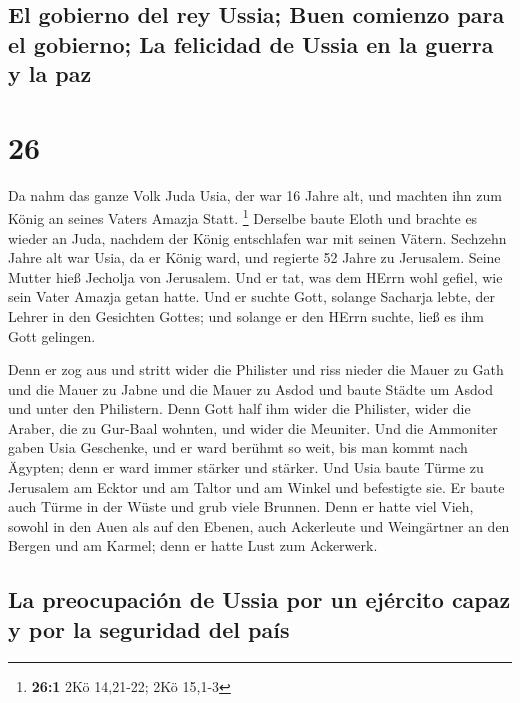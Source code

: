 \hypertarget{el-gobierno-del-rey-ussia-buen-comienzo-para-el-gobierno-la-felicidad-de-ussia-en-la-guerra-y-la-paz}{%
\subsection{El gobierno del rey Ussia; Buen comienzo para el gobierno;
La felicidad de Ussia en la guerra y la
paz}\label{el-gobierno-del-rey-ussia-buen-comienzo-para-el-gobierno-la-felicidad-de-ussia-en-la-guerra-y-la-paz}}

\hypertarget{section-25}{%
\section{26}\label{section-25}}

 Da nahm das ganze Volk Juda Usia, der war 16 Jahre alt,
und machten ihn zum König an seines Vaters Amazja Statt. \footnote{\textbf{26:1}
  2Kö 14,21-22; 2Kö 15,1-3}  Derselbe baute Eloth und
brachte es wieder an Juda, nachdem der König entschlafen war mit seinen
Vätern.  Sechzehn Jahre alt war Usia, da er König ward,
und regierte 52 Jahre zu Jerusalem. Seine Mutter hieß Jecholja von
Jerusalem.  Und er tat, was dem HErrn wohl gefiel, wie
sein Vater Amazja getan hatte.  Und er suchte Gott,
solange Sacharja lebte, der Lehrer in den Gesichten Gottes; und solange
er den HErrn suchte, ließ es ihm Gott gelingen.

 Denn er zog aus und stritt wider die Philister und riss
nieder die Mauer zu Gath und die Mauer zu Jabne und die Mauer zu Asdod
und baute Städte um Asdod und unter den Philistern.  Denn
Gott half ihm wider die Philister, wider die Araber, die zu Gur-Baal
wohnten, und wider die Meuniter.  Und die Ammoniter gaben
Usia Geschenke, und er ward berühmt so weit, bis man kommt nach Ägypten;
denn er ward immer stärker und stärker.  Und Usia baute
Türme zu Jerusalem am Ecktor und am Taltor und am Winkel und befestigte
sie.  Er baute auch Türme in der Wüste und grub viele
Brunnen. Denn er hatte viel Vieh, sowohl in den Auen als auf den Ebenen,
auch Ackerleute und Weingärtner an den Bergen und am Karmel; denn er
hatte Lust zum Ackerwerk.

\hypertarget{la-preocupaciuxf3n-de-ussia-por-un-ejuxe9rcito-capaz-y-por-la-seguridad-del-pauxeds}{%
\subsection{La preocupación de Ussia por un ejército capaz y por la
seguridad del
país}\label{la-preocupaciuxf3n-de-ussia-por-un-ejuxe9rcito-capaz-y-por-la-seguridad-del-pauxeds}}

